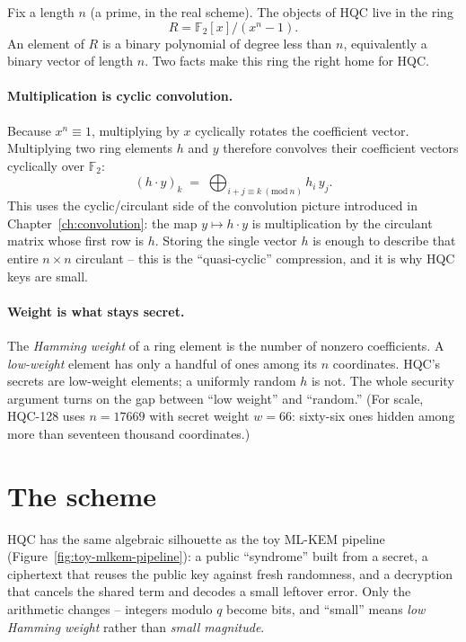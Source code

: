 Fix a length $n$ (a prime, in the real scheme). The objects of HQC live in the ring
\[
R = \mathbb{F}_2[x]\big/(x^n-1).
\]
An element of $R$ is a binary polynomial of degree less than $n$, equivalently a binary vector of length $n$. Two facts make this ring the right home for HQC.

\paragraph{Multiplication is cyclic convolution.} Because $x^n \equiv 1$, multiplying by $x$ cyclically rotates the coefficient vector. Multiplying two ring elements $h$ and $y$ therefore convolves their coefficient vectors cyclically over $\mathbb{F}_2$:
\[
(h\cdot y)_k \;=\; \bigoplus_{i+j\equiv k \ (\mathrm{mod}\ n)} h_i\, y_j .
\]
This uses the cyclic/circulant side of the convolution picture introduced in Chapter~\ref{ch:convolution}: the map $y \mapsto h\cdot y$ is multiplication by the circulant matrix whose first row is $h$. Storing the single vector $h$ is enough to describe that entire $n\times n$ circulant -- this is the ``quasi-cyclic'' compression, and it is why HQC keys are small.

\paragraph{Weight is what stays secret.} The \emph{Hamming weight} of a ring element is the number of nonzero coefficients. A \emph{low-weight} element has only a handful of ones among its $n$ coordinates. HQC's secrets are low-weight elements; a uniformly random $h$ is not. The whole security argument turns on the gap between ``low weight'' and ``random.'' (For scale, HQC-128 uses $n = 17669$ with secret weight $w = 66$: sixty-six ones hidden among more than seventeen thousand coordinates.)

\section{The scheme}

HQC has the same algebraic silhouette as the toy ML-KEM pipeline (Figure~\ref{fig:toy-mlkem-pipeline}): a public ``syndrome'' built from a secret, a ciphertext that reuses the public key against fresh randomness, and a decryption that cancels the shared term and decodes a small leftover error. Only the arithmetic changes -- integers modulo $q$ become bits, and ``small'' means \emph{low Hamming weight} rather than \emph{small magnitude}.

